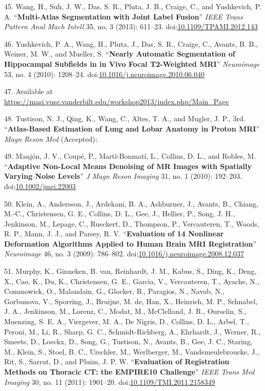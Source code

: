 \documentclass[11pt,]{article}
\begin{document}
45. Wang, H., Suh, J. W., Das, S. R., Pluta, J. B., Craige, C., and
Yushkevich, P. A. ``\textbf{Multi-Atlas Segmentation with Joint Label
Fusion}'' \emph{IEEE Trans Pattern Anal Mach Intell} 35, no. 3 (2013):
611--23.
doi:\href{http://dx.doi.org/10.1109/TPAMI.2012.143}{10.1109/TPAMI.2012.143}

46. Yushkevich, P. A., Wang, H., Pluta, J., Das, S. R., Craige, C.,
Avants, B. B., Weiner, M. W., and Mueller, S. ``\textbf{Nearly Automatic
Segmentation of Hippocampal Subfields in in Vivo Focal T2-Weighted
MRI}'' \emph{Neuroimage} 53, no. 4 (2010): 1208--24.
doi:\href{http://dx.doi.org/10.1016/j.neuroimage.2010.06.040}{10.1016/j.neuroimage.2010.06.040}

47. Available at
\url{https://masi.vuse.vanderbilt.edu/workshop2013/index.php/Main_Page}

48. Tustison, N. J., Qing, K., Wang, C., Altes, T. A., and Mugler, J.
P., 3rd. ``\textbf{Atlas-Based Estimation of Lung and Lobar Anatomy in
Proton MRI}'' \emph{Magn Reson Med} (Accepted):

49. Manj{ó}n, J. V., Coup{é}, P., Mart{í}-Bonmat{í}, L., Collins, D. L.,
and Robles, M. ``\textbf{Adaptive Non-Local Means Denoising of MR Images
with Spatially Varying Noise Levels}'' \emph{J Magn Reson Imaging} 31,
no. 1 (2010): 192--203.
doi:\href{http://dx.doi.org/10.1002/jmri.22003}{10.1002/jmri.22003}

50. Klein, A., Andersson, J., Ardekani, B. A., Ashburner, J., Avants,
B., Chiang, M.-C., Christensen, G. E., Collins, D. L., Gee, J., Hellier,
P., Song, J. H., Jenkinson, M., Lepage, C., Rueckert, D., Thompson, P.,
Vercauteren, T., Woods, R. P., Mann, J. J., and Parsey, R. V.
``\textbf{Evaluation of 14 Nonlinear Deformation Algorithms Applied to
Human Brain MRI Registration}'' \emph{Neuroimage} 46, no. 3 (2009):
786--802.
doi:\href{http://dx.doi.org/10.1016/j.neuroimage.2008.12.037}{10.1016/j.neuroimage.2008.12.037}

51. Murphy, K., Ginneken, B. van, Reinhardt, J. M., Kabus, S., Ding, K.,
Deng, X., Cao, K., Du, K., Christensen, G. E., Garcia, V., Vercauteren,
T., Ayache, N., Commowick, O., Malandain, G., Glocker, B., Paragios, N.,
Navab, N., Gorbunova, V., Sporring, J., Bruijne, M. de, Han, X.,
Heinrich, M. P., Schnabel, J. A., Jenkinson, M., Lorenz, C., Modat, M.,
McClelland, J. R., Ourselin, S., Muenzing, S. E. A., Viergever, M. A.,
De Nigris, D., Collins, D. L., Arbel, T., Peroni, M., Li, R., Sharp, G.
C., Schmidt-Richberg, A., Ehrhardt, J., Werner, R., Smeets, D., Loeckx,
D., Song, G., Tustison, N., Avants, B., Gee, J. C., Staring, M., Klein,
S., Stoel, B. C., Urschler, M., Werlberger, M., Vandemeulebroucke, J.,
Rit, S., Sarrut, D., and Pluim, J. P. W. ``\textbf{Evaluation of
Registration Methods on Thoracic CT: the EMPIRE10 Challenge}''
\emph{IEEE Trans Med Imaging} 30, no. 11 (2011): 1901--20.
doi:\href{http://dx.doi.org/10.1109/TMI.2011.2158349}{10.1109/TMI.2011.2158349}
\end{document}
